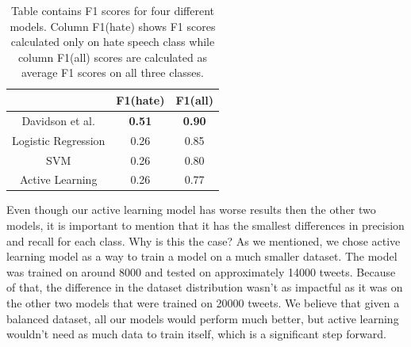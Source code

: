 \documentclass[10pt, a4paper]{article}
\begin{document}
\begin{table}[!ht]
	\centering
	\caption{Table contains F1 scores for four different models. Column F1(hate) shows F1 scores calculated only on hate speech class while column F1(all)  scores are calculated as average F1 scores on all three classes.}
	\label{tbl:scoreAll}
	\begin{tabular}{ccc}
		\hline
		\multicolumn{1}{l}{} & \multicolumn{1}{l}{F1(hate)} & \multicolumn{1}{l}{F1(all)} \\ \hline
		Davidson et al.      & \textbf{0.51}                & \textbf{0.90}               \\ \hline
		Logistic Regression  & 0.26                         & 0.85                        \\ \hline
		SVM                  & 0.26                         & 0.80                        \\ \hline
		Active Learning      & 0.26                         & 0.77                        \\ \hline
	\end{tabular}
\end{table}
Even though our active learning model has worse results then the other two models, it is important to mention that it has the smallest differences in precision and recall for each class. Why is this the case? As we mentioned, we chose active learning model as a way to train a model on a much smaller dataset. The model was trained on around 8000 and tested on approximately 14000 tweets. Because of that, the difference in the dataset distribution wasn't as impactful as it was on the other two models that were trained on 20000 tweets. We believe that given a balanced dataset, all our models would perform much better, but active learning wouldn't need as much data to train itself, which is a significant step forward.
\end{document}

